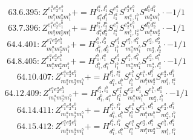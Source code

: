 \documentclass[letterpaper,10pt,fleqn,leqno,onecolumn]{article}
\begin{document}
\begin{equation} \;\;\;\;\;\;  63.6.395: Z^{e_{1}^{a}e_{2}^{a}e_{1}^{b}}_{m_{1}^{a}m_{2}^{a}m_{1}^{b}}+=H^{l_{1}^{a},l_{1}^{b}}_{d_{1}^{a}d_{1}^{b}}S^{e_{1}^{a}}_{l_{1}^{a}}S^{e_{2}^{a}e_{1}^{b}}_{m_{1}^{a},l_{1}^{b}}S^{d_{1}^{a}d_{1}^{b}}_{m_{2}^{a}m_{1}^{b}}\cdot -1/1 \end{equation}
\begin{equation} \;\;\;\;\;\;  63.7.396: Z^{e_{1}^{a}e_{2}^{a}e_{1}^{b}}_{m_{1}^{a}m_{2}^{a}m_{1}^{b}}+=H^{l_{1}^{a},l_{2}^{a}}_{d_{1}^{a}d_{2}^{a}}S^{e_{1}^{a}}_{l_{1}^{a}}S^{e_{2}^{a}e_{1}^{b}}_{m_{1}^{b},l_{2}^{a}}S^{d_{1}^{a}d_{2}^{a}}_{m_{1}^{a}m_{2}^{a}}\cdot -1/1 \end{equation}
\begin{equation} \;\;\;\;\;\;  64.4.401: Z^{e_{1}^{a}e_{2}^{a}e_{1}^{b}}_{m_{1}^{a}m_{2}^{a}m_{1}^{b}}+=H^{l_{1}^{b},l_{2}^{b}}_{d_{1}^{b},d_{2}^{b}}S^{e_{1}^{b}}_{l_{1}^{b}}S^{e_{1}^{a},d_{1}^{b}}_{m_{1}^{a}m_{1}^{b}}S^{e_{2}^{a},d_{2}^{b}}_{m_{2}^{a},l_{2}^{b}}\cdot -1/1 \end{equation}
\begin{equation} \;\;\;\;\;\;  64.8.405: Z^{e_{1}^{a}e_{2}^{a}e_{1}^{b}}_{m_{1}^{a}m_{2}^{a}m_{1}^{b}}+=H^{l_{1}^{b},l_{1}^{a}}_{d_{1}^{b},d_{1}^{a}}S^{e_{1}^{b}}_{l_{1}^{b}}S^{e_{1}^{a},d_{1}^{b}}_{m_{1}^{a}m_{1}^{b}}S^{e_{2}^{a},d_{1}^{a}}_{m_{2}^{a},l_{1}^{a}}\cdot -1/1 \end{equation}
\begin{equation} \;\;\;\;\;\;  64.10.407: Z^{e_{1}^{a}e_{2}^{a}e_{1}^{b}}_{m_{1}^{a}m_{2}^{a}m_{1}^{b}}+=H^{l_{1}^{b},l_{1}^{a}}_{d_{1}^{a},d_{1}^{b}}S^{e_{1}^{b}}_{l_{1}^{b}}S^{e_{1}^{a},d_{1}^{a}}_{m_{1}^{a}m_{2}^{a}}S^{e_{2}^{a},d_{1}^{b}}_{m_{1}^{b},l_{1}^{a}} \end{equation}
\begin{equation} \;\;\;\;\;\;  64.12.409: Z^{e_{1}^{a}e_{2}^{a}e_{1}^{b}}_{m_{1}^{a}m_{2}^{a}m_{1}^{b}}+=H^{l_{1}^{a},l_{1}^{b}}_{d_{1}^{b},d_{1}^{a}}S^{e_{1}^{a}}_{l_{1}^{a}}S^{e_{2}^{a},d_{1}^{b}}_{m_{1}^{a}m_{1}^{b}}S^{e_{1}^{b},d_{1}^{a}}_{m_{2}^{a},l_{1}^{b}}\cdot -1/1 \end{equation}
\begin{equation} \;\;\;\;\;\;  64.14.411: Z^{e_{1}^{a}e_{2}^{a}e_{1}^{b}}_{m_{1}^{a}m_{2}^{a}m_{1}^{b}}+=H^{l_{1}^{a},l_{1}^{b}}_{d_{1}^{a},d_{1}^{b}}S^{e_{1}^{a}}_{l_{1}^{a}}S^{e_{1}^{b},d_{1}^{a}}_{m_{1}^{a}m_{1}^{b}}S^{e_{2}^{a},d_{1}^{b}}_{m_{2}^{a},l_{1}^{b}} \end{equation}
\begin{equation} \;\;\;\;\;\;  64.15.412: Z^{e_{1}^{a}e_{2}^{a}e_{1}^{b}}_{m_{1}^{a}m_{2}^{a}m_{1}^{b}}+=H^{l_{1}^{a},l_{1}^{b}}_{d_{1}^{a},d_{1}^{b}}S^{e_{1}^{a}}_{l_{1}^{a}}S^{e_{2}^{a},d_{1}^{a}}_{m_{1}^{a}m_{2}^{a}}S^{e_{1}^{b},d_{1}^{b}}_{m_{1}^{b},l_{1}^{b}} \end{equation}
\end{document}
